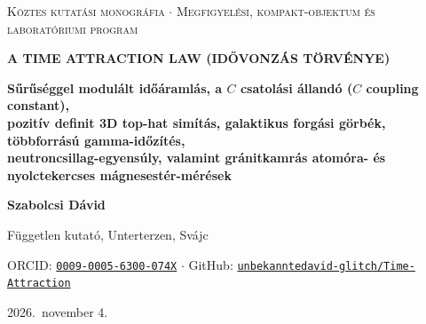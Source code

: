 \documentclass[10pt,a4paper]{article}
\begin{document}
\thispagestyle{titlefoot}
\vspace*{-8mm}
\noindent{\color{navy}\rule{\linewidth}{2pt}}\par\vspace{1.5mm}
\begin{center}
  {\footnotesize\scshape\color{slate}K\"oztes kutat\'asi monogr\'afia $\cdot$ Megfigyel\'esi, kompakt-objektum \'es laborat\'oriumi program}\par\vspace{1.5mm}
  {\LARGE\bfseries\color{navy}A TIME ATTRACTION LAW (ID\H{O}VONZ\'AS T\"ORV\'ENYE)}\par\vspace{2mm}
  {\large\bfseries\color{slate}S\H{u}r\H{u}s\'eggel modul\'alt id\H{o}\'araml\'as, a $C$ csatol\'asi \'alland\'o ($C$ coupling constant),}\\
  {\large\bfseries\color{slate}pozit\'iv definit 3D top-hat sim\'it\'as, galaktikus forg\'asi g\"orb\'ek, t\"obbforr\'as\'u gamma-id\H{o}z\'it\'es,}\\
  {\large\bfseries\color{slate}neutroncsillag-egyens\'uly, valamint gr\'anitkamr\'as atom\'ora- \'es nyolctekercses m\'agnesest\'er-m\'er\'esek}\par\vspace{2mm}
  {\normalsize\bfseries Szabolcsi D\'avid}\par\vspace{1mm}
  {\small F\"uggetlen kutat\'o, Unterterzen, Sv\'ajc}\par
  {\small ORCID: \href{https://orcid.org/0009-0005-6300-074X}{\texttt{0009-0005-6300-074X}} $\cdot$ GitHub: \href{https://github.com/unbekanntedavid-glitch/Time-Attraction}{\texttt{unbekanntedavid-glitch/Time-Attraction}}}\par
  {\small 2026.\ november 4.}
\end{center}
\vspace{1.5mm}
\noindent{\color{navy}\rule{\linewidth}{0.8pt}}\par\vspace{2mm}
\end{document}

